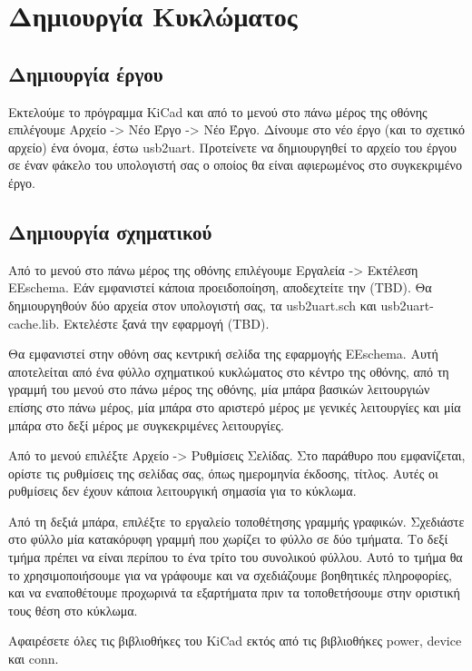 \documentclass[a4paper]{article}
\begin{document}
\section{Δημιουργία Κυκλώματος}

\subsection{Δημιουργία έργου}
Εκτελούμε το πρόγραμμα KiCad και από το μενού στο πάνω μέρος της οθόνης επιλέγουμε Αρχείο -> Νέο Έργο -> Νέο Έργο. Δίνουμε στο νέο έργο (και το σχετικό αρχείο) ένα όνομα, έστω usb2uart. Προτείνετε να δημιουργηθεί το αρχείο του έργου σε έναν φάκελο του υπολογιστή σας ο οποίος θα είναι αφιερωμένος στο συγκεκριμένο έργο.

\subsection{Δημιουργία σχηματικού}
Από το μενού στο πάνω μέρος της οθόνης επιλέγουμε Εργαλεία -> Εκτέλεση EEschema. Εάν εμφανιστεί κάποια προειδοποίηση, αποδεχτείτε την (TBD). Θα δημιουργηθούν δύο αρχεία στον υπολογιστή σας, τα usb2uart.sch και usb2uart-cache.lib. Εκτελέστε ξανά την εφαρμογή (TBD).

Θα εμφανιστεί στην οθόνη σας κεντρική σελίδα της εφαρμογής EEschema. Αυτή αποτελείται από ένα φύλλο σχηματικού κυκλώματος στο κέντρο της οθόνης, από τη γραμμή του μενού στο πάνω μέρος της οθόνης, μία μπάρα βασικών λειτουργιών επίσης στο πάνω μέρος, μία μπάρα στο αριστερό μέρος με γενικές λειτουργίες και μία μπάρα στο δεξί μέρος με συγκεκριμένες λειτουργίες.

Από το μενού επιλέξτε Αρχείο -> Ρυθμίσεις Σελίδας. Στο παράθυρο που εμφανίζεται, ορίστε τις ρυθμίσεις της σελίδας σας, όπως ημερομηνία έκδοσης, τίτλος. Αυτές οι ρυθμίσεις δεν έχουν κάποια λειτουργική σημασία για το κύκλωμα.

Από τη δεξιά μπάρα, επιλέξτε το εργαλείο τοποθέτησης γραμμής γραφικών. Σχεδιάστε στο φύλλο μία κατακόρυφη γραμμή που χωρίζει το φύλλο σε δύο τμήματα. Το δεξί τμήμα πρέπει να είναι περίπου το ένα τρίτο του συνολικού φύλλου. Αυτό το τμήμα θα το χρησιμοποιήσουμε για να γράφουμε και να σχεδιάζουμε βοηθητικές πληροφορίες, και να εναποθέτουμε προχωρινά τα εξαρτήματα πριν τα τοποθετήσουμε στην οριστική τους θέση στο κύκλωμα.

Αφαιρέσετε όλες τις βιβλιοθήκες του KiCad εκτός από τις βιβλιοθήκες power, device και conn.
\end{document}
